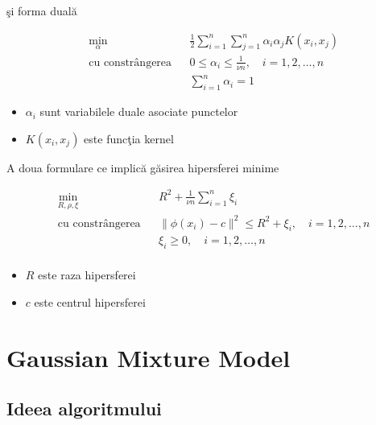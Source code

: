 şi forma duală

    \begin{equation}
        \begin{aligned}
        & \underset{\alpha}{\text{min}}
        & & \frac{1}{2} \sum_{i=1}^{n} \sum_{j=1}^{n} \alpha_i \alpha_j K(x_i, x_j) \\
        & \text{cu constrângerea}
        & & 0 \leq \alpha_i \leq \frac{1}{\nu n}, \quad i=1,2,\ldots,n \\
        &&& \sum_{i=1}^{n} \alpha_i = 1
        \end{aligned}
        \end{equation}
    
    \begin{itemize}
        \item $\alpha_i$ sunt variabilele duale asociate punctelor 
        \item $K(x_i, x_j)$ este funcţia kernel
    \end{itemize}

A doua formulare ce implică găsirea hipersferei minime

    \begin{equation}
        \begin{aligned}
        & \underset{R, \rho, \xi}{\text{min}}
        & & R^2 + \frac{1}{\nu n} \sum_{i=1}^{n} \xi_i \\
        & \text{cu constrângerea}
        & & \|\phi(x_i) - c\|^2 \leq R^2 + \xi_i, \quad i=1,2,\ldots,n \\
        &&& \xi_i \geq 0, \quad i=1,2,\ldots,n \\
        \end{aligned}
        \end{equation}
        
        \begin{itemize}
        \item $R$ este raza hipersferei
        \item $c$ este centrul hipersferei
        \end{itemize}
        

\section{Gaussian Mixture Model}

\subsection{Ideea algoritmului}

